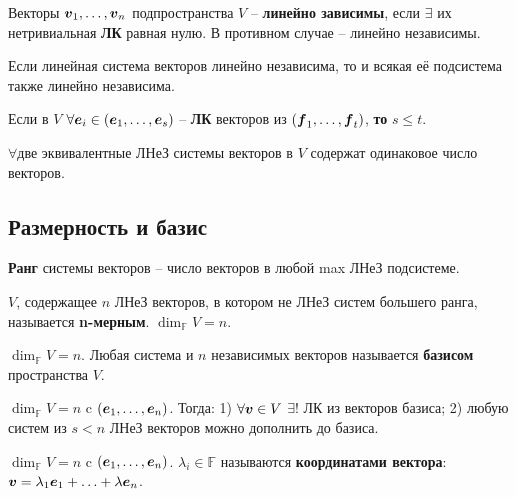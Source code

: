 \begin{to_def}
	Векторы $\mbox{\boldmath $v$}_1, \ldots, \mbox{\boldmath $v$}_n$ подпространства $V$ -- \textbf{линейно зависимы}, если $\exists$ их нетривиальная \textbf{ЛК} равная нулю. В противном случае -- линейно независимы.
\end{to_def}

\begin{to_thr}
	Если линейная система векторов линейно независима, то и всякая её подсистема также линейно независима.
\end{to_thr}	

\begin{to_thr}
	Если в $V$ $\forall \mbox{\boldmath $e$}_i \in (\mbox{\boldmath $e$}_1,\ldots,\mbox{\boldmath $e$}_s)$ -- \textbf{ЛК} векторов из $(\mbox{\boldmath $f$}_1,\ldots,\mbox{\boldmath $f$}_t)$, \textbf{то} $s \leq t$.
\end{to_thr}

\begin{to_con}
	$\forall$две эквивалентные ЛНеЗ системы векторов в $V$ содержат одинаковое число векторов.
\end{to_con}

\subsection{Размерность и базис}
\begin{to_def}
	\textbf{Ранг} системы векторов -- число векторов в любой max ЛНеЗ подсистеме.
\end{to_def}

\begin{to_def}
	$V$, содержащее $n$ ЛНеЗ векторов, в котором не ЛНеЗ систем большего ранга, называется \textbf{n-мерным}. $\dim_\mathbb{F} V = n$. 
\end{to_def}

\begin{to_def}
	$\dim_\mathbb{F} V = n$. Любая система и $n$ независимых векторов называется \textbf{базисом} пространства $V$.
\end{to_def}

\begin{to_thr}
	$\dim_\mathbb{F} V = n$ c $( \mbox{\boldmath $e$}_1,\ldots,\mbox{\boldmath $e$}_n)$. Тогда: 1) $\forall \mbox{\boldmath $v$} \in V$ $\exists!$ ЛК из векторов базиса; 2) любую систем из $s<n$ ЛНеЗ векторов можно дополнить до базиса. 
\end{to_thr}

\begin{to_def}
	$\dim_\mathbb{F} V = n$ c $( \mbox{\boldmath $e$}_1,\ldots,\mbox{\boldmath $e$}_n)$. $\lambda_i \in \mathbb{F}$ называются \textbf{координатами вектора}: $\mbox{\boldmath $v$} = \lambda_1 \mbox{\boldmath $e$}_1 + \ldots + \lambda \mbox{\boldmath $e$}_n$. 
\end{to_def}

